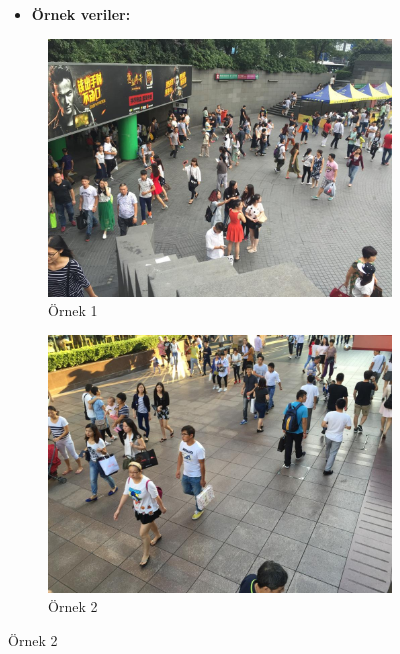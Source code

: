 \documentclass[10pt,a4paper]{report}
\begin{document}
		
	\begin{figure}[!h]
		\begin{itemize}
			\raggedright \item[{}] \textbf{Örnek veriler:}  
		\end{itemize}
		\begin{subfigure}{\textwidth}
			\raggedright
			\includegraphics[width=\textwidth]{ornek1.jpg}
			\caption{Örnek 1}
			\label{Ornek1}
		\end{subfigure}
		\begin{subfigure}{\textwidth}
			\raggedright
			\includegraphics[width=\textwidth]{ornek2.jpg}
			\caption{Örnek 2}
			\label{Ornek2}
		\end{subfigure}
	\end{figure}
	
\end{document}
